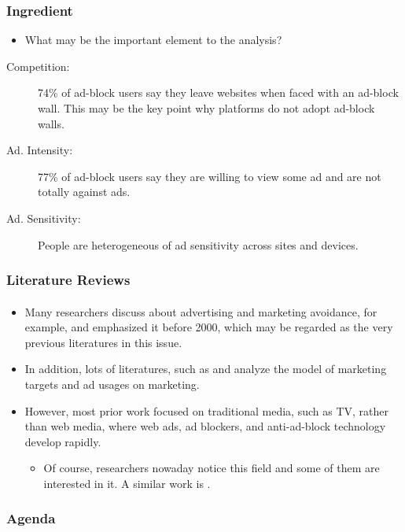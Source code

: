 \documentclass{beamer}
\begin{document}
\begin{frame}
    \frametitle{Ingredient}
    \begin{itemize}
        \item What may be the important element to the analysis?
    \end{itemize}

    \begin{description}
        \item[Competition:] 74\% of ad-block users say they leave websites
            when faced with an ad-block wall. This may be the key point
            why platforms do not adopt ad-block walls.
        \item[Ad. Intensity:] 77\% of ad-block users say they are willing 
            to view some ad and are not totally against ads.
        \item[Ad. Sensitivity:] People are heterogeneous of ad sensitivity
            across sites and devices.
    \end{description}
\end{frame}

\begin{frame}[label=current]
    \frametitle{Literature Reviews}
    \framesubtitle{}
    \begin{itemize}
        \item Many researchers discuss about advertising and marketing avoidance, for example,
            \citet{Clancey} and \citet{Speck} emphasized it before 2000, which may be 
            regarded as the very previous literatures in this issue.
        \item In addition, lots of literatures, such as \citet{Johnson} and \citet{Anderson}
            analyze the model of marketing targets and ad usages on marketing.
        \item However, most prior work focused on traditional media, such as TV,
            rather than web media, where web ads, ad blockers, and anti-ad-block technology
            develop rapidly. 
            \begin{itemize}
                \item Of course, researchers nowaday notice this field and some of them are
                    interested in
                    it. A similar work is \citet{Aseri}.
            \end{itemize}
    \end{itemize}
\end{frame}

\begin{frame}
    \frametitle{Agenda}
    \tableofcontents[hideallsubsections]
\end{frame} 
\end{document}
